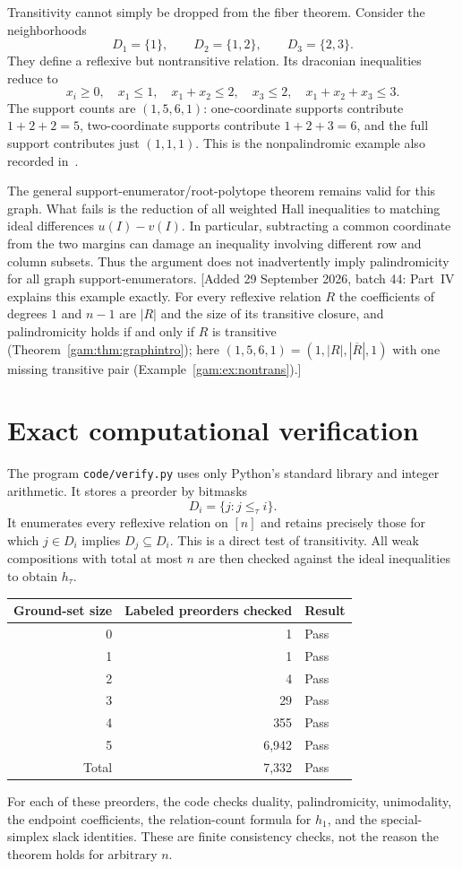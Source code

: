 \documentclass[11pt]{article}
\numberwithin{equation}{section}
\theoremstyle{definition}
\begin{document}
Transitivity cannot simply be dropped from the fiber theorem. Consider the
neighborhoods
\[
 D_1=\{1\},\qquad D_2=\{1,2\},\qquad D_3=\{2,3\}.
\]
They define a reflexive but nontransitive relation. Its draconian inequalities
reduce to
\[
 x_i\geq0,\quad x_1\leq1,\quad x_1+x_2\leq2,\quad
 x_3\leq2,\quad x_1+x_2+x_3\leq3.
\]
The support counts are $(1,5,6,1)$: one-coordinate supports contribute
$1+2+2=5$, two-coordinate supports contribute $1+2+3=6$, and the full support
contributes just $(1,1,1)$. This is the nonpalindromic example also recorded
in~\cite[Remark~5.5]{AC}.

The general support-enumerator/root-polytope theorem remains valid for this
graph. What fails is the reduction of all weighted Hall inequalities to
matching ideal differences $u(I)-v(I)$. In particular, subtracting a common
coordinate from the two margins can damage an inequality involving different
row and column subsets. Thus the argument does not inadvertently imply
palindromicity for all graph support-enumerators.
[Added 29 September 2026, batch 44: Part~IV explains this example exactly.
For every reflexive relation $R$ the coefficients of degrees $1$ and $n-1$
are $|R|$ and the size of its transitive closure, and palindromicity holds
if and only if $R$ is transitive (Theorem~\ref{gam:thm:graphintro}); here
$(1,5,6,1)=(1,|R|,|\overline R|,1)$ with one missing transitive pair
(Example~\ref{gam:ex:nontrans}).]

\section{Exact computational verification}\label{sec:computations}

The program \texttt{code/verify.py} uses only Python's standard library and
integer arithmetic. It stores a preorder by bitmasks
\[
 D_i=\{j:j\leq_\tau i\}.
\]
It enumerates every reflexive relation on $[n]$ and retains precisely those
for which $j\in D_i$ implies $D_j\subseteq D_i$. This is a direct test of
transitivity. All weak compositions with total at most $n$ are then checked
against the ideal inequalities to obtain $h_\tau$.

\begin{center}
\begin{tabular}{@{}r r l@{}}
\toprule
Ground-set size & Labeled preorders checked & Result\\
\midrule
0 & 1 & Pass\\
1 & 1 & Pass\\
2 & 4 & Pass\\
3 & 29 & Pass\\
4 & 355 & Pass\\
5 & 6,942 & Pass\\
\midrule
Total & 7,332 & Pass\\
\bottomrule
\end{tabular}
\end{center}
For each of these preorders, the code checks duality, palindromicity,
unimodality, the endpoint coefficients, the relation-count formula for $h_1$,
and the special-simplex slack identities. These are finite consistency checks,
not the reason the theorem holds for arbitrary $n$.
\end{document}
